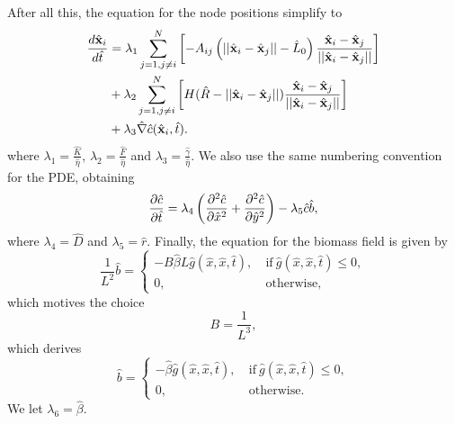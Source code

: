 After all this, the equation for the node positions simplify to 
\begin{equation*}
    \begin{split}
        \frac{d \hat{\vb{x}}_i}{d \hat{t}} &= 
        \lambda_1 \sum_{j = 1, j \neq i}^N   \left[ - A_{ij} \left(||\hat{\vb{x}}_i - \hat{\vb{x}}_j|| - \hat{L}_0\right) \frac{\hat{\vb{x}}_i - \hat{\vb{x}}_j}{||\hat{\vb{x}}_i - \hat{\vb{x}}_j||} \right]\\
         &+ \lambda_2\sum_{j = 1, j \neq i}^N \left[H(\hat{R} - ||\hat{\vb{x}}_i - \hat{\vb{x}}_j||) \frac{\hat{\vb{x}}_i - \hat{\vb{x}}_j}{||\hat{\vb{x}}_i - \hat{\vb{x}}_j||}     \right]\\ 
         &+ \lambda_3  \hat{\nabla}  \hat{c} (\hat{\vb{x}}_i, \hat{t}).
    \end{split}
\end{equation*}
where $\lambda_1 = \frac{\hat{K}}{\hat{\eta}}$, $\lambda_2 = \frac{\hat{F}}{\hat{\eta}}$ and 
$\lambda_3 = \frac{\hat{\gamma}}{\hat{\eta}}$. We also use the same numbering convention for the PDE,
obtaining
\begin{equation*}
    \pdv{\hat{c}}{\hat{t}} =  \lambda_4 \left(\pdv[2]{\hat{c}}{\hat{x}} + \pdv[2]{\hat{c}}{\hat{y}} \right) -
      \lambda_5 \hat{c} \hat{b},
\end{equation*}
where $\lambda_4 = \hat{D}$ and $\lambda_5 = \hat{r}$. Finally, the equation for the biomass 
field is given by 
\begin{equation*}
    \frac{1}{L^2}\hat{b} = \begin{cases}
                -B \hat{\beta} L \hat{g}(\hat{x},\hat{x},\hat{t}), & \ \textrm{if} \ \hat{g}(\hat{x},\hat{x},\hat{t}) \leq 0, \\
                    0, &    \ \textrm{otherwise},
               \end{cases}
\end{equation*}
which motives the choice
\begin{equation*}
    B = \frac{1}{L^3},
\end{equation*}
which derives 
\begin{equation*}
    \hat{b} = \begin{cases}
                - \hat{\beta} \hat{g}(\hat{x},\hat{x},\hat{t}), & \ \textrm{if} \ \hat{g}(\hat{x},\hat{x},\hat{t}) \leq 0, \\
                    0, &    \ \textrm{otherwise}.
               \end{cases}
\end{equation*}
We let $\lambda_6 = \hat{\beta}$.
\\
\\


